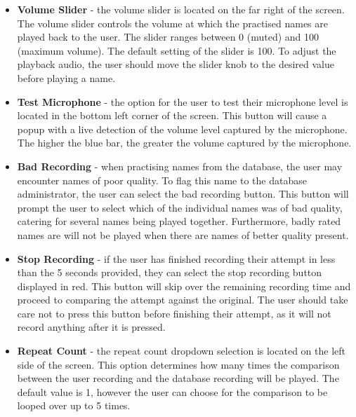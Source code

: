 \documentclass{article}
\begin{document}
\begin{itemize}
	\item \textbf{Volume Slider} - the volume slider is located on the far right
	of the screen. The volume slider controls the volume at which the practised
	names are played back to the user. The slider ranges between 0 (muted) and
	100 (maximum volume). The default setting of the slider is 100. To adjust
	the playback audio, the user should move the slider knob to the desired
	value before playing a name.

	\item \textbf{Test Microphone} - the option for the user to test their
	microphone level is located in the bottom left corner of the screen. This
	button will cause a popup with a live detection of the volume level captured
	by the microphone. The higher the blue bar, the greater the volume captured
	by the microphone.

	\item \textbf{Bad Recording} - when practising names from the database, the
	user may encounter names of poor quality. To flag this name to  the database
	administrator, the user can select the bad recording button. This button
	will prompt the user to select which of the  individual names was of bad
	quality, catering for several names being played together. Furthermore,
	badly rated names are will not  be played when there are names of better
	quality present.

	\item \textbf{Stop Recording} - if the user has finished recording their
	attempt in less than the 5 seconds provided, they can select the stop
	recording button displayed in red. This button will skip over the remaining
	recording time and proceed to comparing the  attempt against the original.
	The user should take care not to press this button before finishing their
	attempt, as it will not record anything after it is pressed.

	\item \textbf{Repeat Count} - the repeat count dropdown selection is located
	on the left side of the screen. This option determines  how many times the
	comparison between the user recording and the database recording will be
	played. The default value is 1,  however the user can choose for the
	comparison to be looped over up to 5 times.

\end{itemize}
\end{document}

